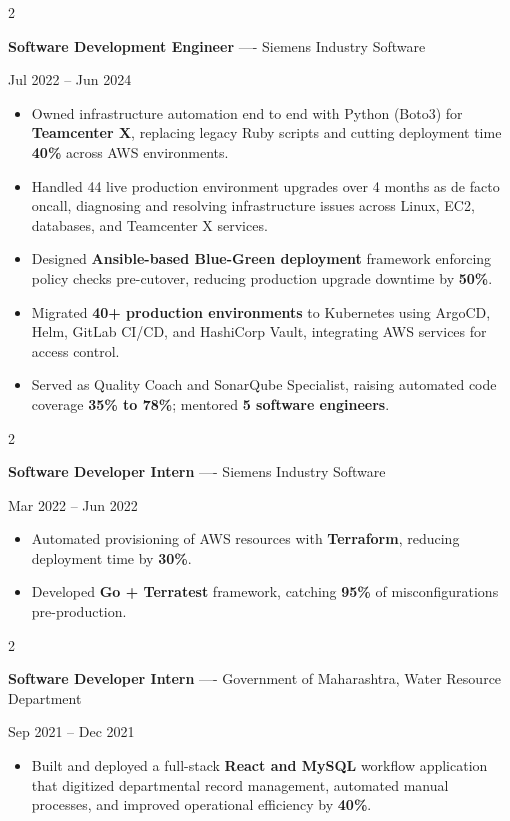 \documentclass[10pt, letterpaper]{article}
\newenvironment{highlights}{
    \begin{itemize}[
        topsep=0.10 cm,
        parsep=0.06 cm,
        partopsep=0pt,
        itemsep=0.06 cm,
        leftmargin=12pt
    ]
}{
    \end{itemize}
}
\newenvironment{twocolentry}[2][]{
    \onecolentry
    \def\secondColumn{#2}
    \setcolumnwidth{\fill, 4.5 cm}
    \begin{paracol}{2}
}{
    \switchcolumn \raggedleft \secondColumn
    \end{paracol}
    \endonecolentry
}
\begin{document}
\vspace{0.15 cm}

\begin{twocolentry}{Jul 2022 -- Jun 2024}
\textbf{Software Development Engineer} ---- Siemens Industry Software
\end{twocolentry}
\begin{highlights}
  \item Owned infrastructure automation end to end with Python (Boto3) for \textbf{Teamcenter X}, replacing legacy Ruby scripts and cutting deployment time \textbf{40\%} across AWS environments.
  \item Handled 44 live production environment upgrades over 4 months as de facto oncall, diagnosing and resolving infrastructure issues across Linux, EC2, databases, and Teamcenter X services.
  \item Designed \textbf{Ansible-based Blue-Green deployment} framework enforcing policy checks pre-cutover, reducing production upgrade downtime by \textbf{50\%}.
  \item Migrated \textbf{40+ production environments} to Kubernetes using ArgoCD, Helm, GitLab CI/CD, and HashiCorp Vault, integrating AWS services for access control.
  \item Served as Quality Coach and SonarQube Specialist, raising automated code coverage \textbf{35\% to 78\%}; mentored \textbf{5 software engineers}.
\end{highlights}

\vspace{0.15 cm}

\begin{twocolentry}{Mar 2022 -- Jun 2022}
\textbf{Software Developer Intern} ---- Siemens Industry Software
\end{twocolentry}
\begin{highlights}
  \item Automated provisioning of AWS resources with \textbf{Terraform}, reducing deployment time by \textbf{30\%}.
  \item Developed \textbf{Go + Terratest} framework, catching \textbf{95\%} of misconfigurations pre-production.
\end{highlights}

\vspace{0.15 cm}

\begin{twocolentry}{Sep 2021 -- Dec 2021}
\textbf{Software Developer Intern} ---- Government of Maharashtra, Water Resource Department
\end{twocolentry}
\begin{highlights}
  \item Built and deployed a full-stack \textbf{React and MySQL} workflow application that digitized departmental record management, automated manual processes, and improved operational efficiency by \textbf{40\%}.
\end{highlights}
\end{document}
